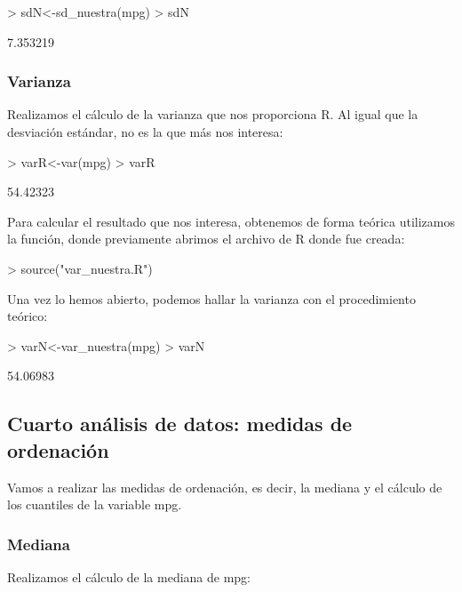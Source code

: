 \documentclass [a4paper] {article}
\begin{document}
\begin{Schunk}
\begin{Sinput}
> sdN<-sd_nuestra(mpg)
> sdN
\end{Sinput}
\begin{Soutput}
[1] 7.353219
\end{Soutput}
\end{Schunk}

\subsubsection{Varianza}
Realizamos el cálculo de la varianza que nos proporciona R. Al igual que la desviación estándar,
no es la que más nos interesa:

\begin{Schunk}
\begin{Sinput}
> varR<-var(mpg)
> varR
\end{Sinput}
\begin{Soutput}
[1] 54.42323
\end{Soutput}
\end{Schunk}

Para calcular el resultado que nos interesa, obtenemos de forma teórica utilizamos 
la función, donde previamente abrimos el archivo de R donde fue creada:

\begin{Schunk}
\begin{Sinput}
> source("var_nuestra.R")
\end{Sinput}
\end{Schunk}

Una vez lo hemos abierto, podemos hallar la varianza con el procedimiento teórico:

\begin{Schunk}
\begin{Sinput}
> varN<-var_nuestra(mpg)
> varN
\end{Sinput}
\begin{Soutput}
[1] 54.06983
\end{Soutput}
\end{Schunk}

\subsection{Cuarto análisis de datos: medidas de ordenación}
Vamos a realizar las medidas de ordenación, es decir, la mediana y el cálculo de los cuantiles de la variable mpg.

\subsubsection{Mediana}
Realizamos el cálculo de la mediana de mpg:
\end{document}
